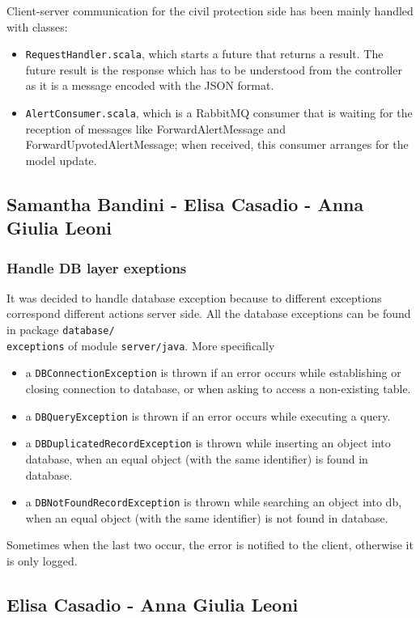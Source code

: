 \documentclass[a4paper,12pt]{report}
\begin{document}
Client-server communication for the civil protection side has been mainly handled with classes:

\begin{itemize}
\item \texttt{RequestHandler.scala}, which starts a future that returns a result. The future result is the response which has to be understood from the controller as it is a message encoded with the JSON format.
\item \texttt{AlertConsumer.scala}, which is a RabbitMQ consumer that is waiting for the reception of messages like ForwardAlertMessage and ForwardUpvotedAlertMessage; when received, this consumer arranges for the model update.
\end{itemize}

\subsection{Samantha Bandini - Elisa Casadio - Anna Giulia Leoni}
\subsubsection{Handle DB layer exeptions}
It was decided to handle database exception because to different exceptions correspond different actions server side. All the database exceptions can be found in package \texttt{database/\\exceptions} of module \texttt{server/java}. More specifically
\begin{itemize}
\item a \texttt{DBConnectionException} is thrown if an error occurs while establishing or closing connection to database, or when asking to access a non-existing table.
\item a \texttt{DBQueryException} is thrown if an error occurs while executing a query.
\item a \texttt{DBDuplicatedRecordException} is thrown while inserting an object into database, when an equal object (with the same identifier) is found in database.
\item a \texttt{DBNotFoundRecordException} is thrown while searching an object into db, when an equal object (with the same identifier) is not found in database.
\end{itemize}
Sometimes when the last two occur, the error is notified to the client, otherwise it is only logged.

\subsection{Elisa Casadio - Anna Giulia Leoni}
\end{document}
